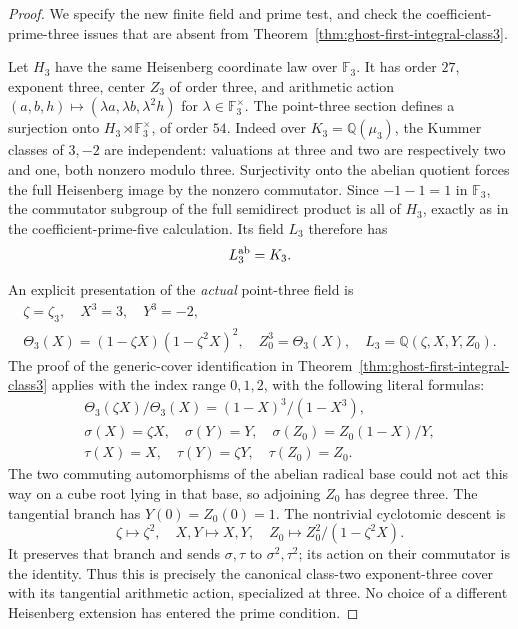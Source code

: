 \begin{proof}
We specify the new finite field and prime test, and check
the coefficient-prime-three issues that are absent from
Theorem~\ref{thm:ghost-first-integral-class3}.

Let \(H_3\) have the same Heisenberg coordinate law
over \(\mathbb F_3\). It has order \(27\), exponent
three, center \(Z_3\) of order three, and arithmetic
action \((a,b,h)\mapsto(\lambda a,\lambda b,\lambda^2h)\)
for \(\lambda\in\mathbb F_3^\times\). The point-three
section defines a surjection onto
\(H_3\rtimes\mathbb F_3^\times\), of order \(54\).
Indeed over \(K_3=\mathbb Q(\mu_3)\), the Kummer
classes of \(3,-2\) are independent: valuations at
three and two are respectively two and one, both
nonzero modulo three. Surjectivity onto the abelian
quotient forces the full Heisenberg image by the
nonzero commutator. Since \(-1-1=1\) in
\(\mathbb F_3\), the commutator subgroup of the full
semidirect product is all of \(H_3\), exactly as in
the coefficient-prime-five calculation. Its field
\(L_3\) therefore has
\[
                         L_3^{\rm ab}=K_3.
\]

An explicit presentation of the \emph{actual} point-three
field is
\[
 \begin{gathered}
 \zeta=\zeta_3,\quad X^3=3,\quad Y^3=-2,\\
 \Theta_3(X)=(1-\zeta X)(1-\zeta^2X)^2,
 \quad Z_0^3=\Theta_3(X),\quad
 L_3=\mathbb Q(\zeta,X,Y,Z_0).
 \end{gathered}
\]
The proof of the generic-cover identification in
Theorem~\ref{thm:ghost-first-integral-class3} applies
with the index range \(0,1,2\), with the following
literal formulas:
\[
 \begin{gathered}
 \Theta_3(\zeta X)/\Theta_3(X)
          =(1-X)^3/(1-X^3),\\
 \sigma(X)=\zeta X,\quad \sigma(Y)=Y,\quad
 \sigma(Z_0)=Z_0(1-X)/Y,\\
 \tau(X)=X,\quad\tau(Y)=\zeta Y,\quad\tau(Z_0)=Z_0.
 \end{gathered}
\]
The two commuting automorphisms of the abelian radical
base could not act this way on a cube root lying in
that base, so adjoining \(Z_0\) has degree three.
The tangential branch has \(Y(0)=Z_0(0)=1\).
The nontrivial cyclotomic descent is
\[
 \zeta\longmapsto\zeta^2,\quad X,Y\longmapsto X,Y,
       \quad Z_0\longmapsto Z_0^2/(1-\zeta^2X).
\]
It preserves that branch and sends \(\sigma,\tau\)
to \(\sigma^2,\tau^2\); its action on their
commutator is the identity. Thus this is precisely
the canonical class-two exponent-three cover with
its tangential arithmetic action, specialized at
three. No choice of a different Heisenberg extension
has entered the prime condition.


\end{proof}
